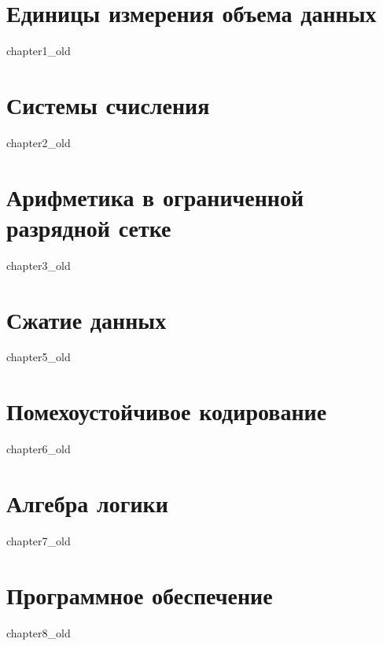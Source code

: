 \documentclass[a5paper,14pt]{report}
\begin{document}
\chapter{Единицы измерения объема данных}
 {chapter1_old}

\chapter{Системы счисления}
 {chapter2_old}

\chapter{Арифметика в ограниченной разрядной сетке}
 {chapter3_old}


\chapter{Сжатие данных}
 {chapter5_old}

\chapter{Помехоустойчивое кодирование}
 {chapter6_old}

\chapter{Алгебра логики}
 {chapter7_old}

\chapter{Программное обеспечение}
 {chapter8_old}



\end{document}
